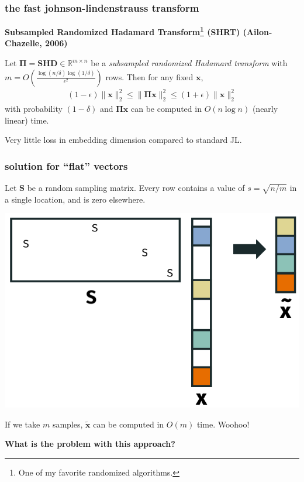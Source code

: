 \documentclass[compress]{beamer}
\newcommand{\bs}[1]{\boldsymbol{#1}}
\newcommand{\bv}[1]{\mathbf{#1}}
\newcommand{\R}{\mathbb{R}}
\newtheorem{claim}[theorem]{Claim}
\begin{document}
\begin{frame}[t]
	\frametitle{the fast johnson-lindenstrauss transform}
	\small
	\begin{center}
		\textbf{Subsampled Randomized Hadamard Transform\footnote{One of my favorite randomized algorithms.} (SHRT) (Ailon-Chazelle, 2006)}
	\end{center}
	\begin{theorem}
		Let $\bs{\Pi} = \bv{SHD} \in \R^{m\times n}$ be a \emph{subsampled randomized Hadamard transform} with $m = O\left(\frac{\log(n/\delta)\log(1/\delta)}{\epsilon^2}\right)$ rows. Then for any fixed $\bv{x}$, 
		\begin{align*}
			(1-\epsilon)\|\bv{x}\|_2^2 \leq  \|\bs{\Pi}\bv{x}\|_2^2 \leq (1+\epsilon) \|\bv{x}\|_2^2
		\end{align*}
		with probability $(1-\delta)$ and $\bs{\Pi}\bv{x}$ can be computed in $O(n\log n)$ (nearly linear) time. 
	\end{theorem}
		Very little loss in embedding dimension compared to standard JL.
\end{frame}

\begin{frame}[t]
	\frametitle{solution for ``flat'' vectors}
	Let $\bv{S}$ be a \alert{random sampling matrix}. Every row contains a value of $s = \sqrt{n/m}$ in a single location, and is zero elsewhere. 
	
	\vspace{-1em}
		\begin{center}
		\includegraphics[width=.6\textwidth]{subsampling.png}
	\end{center}
If we take $m$ samples, $\tilde{\bv{x}}$ can be computed in $O(m)$ time. Woohoo!

\begin{center}
	\textbf{\alert{What is the problem with this approach?}}
\end{center}

\end{frame}
\end{document}
